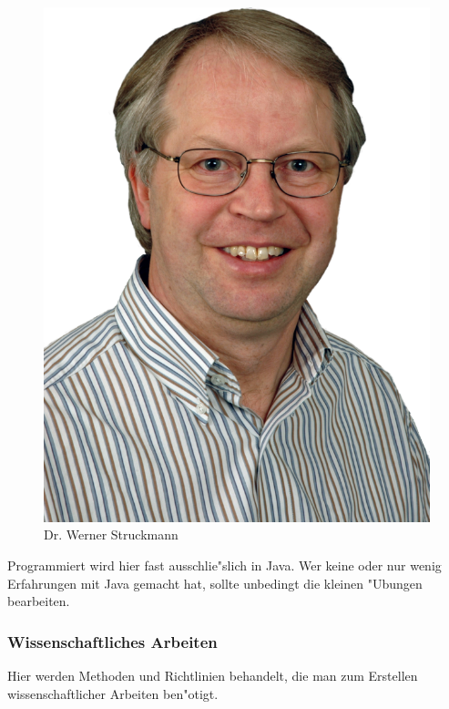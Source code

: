 \begin{figure}[h]
	\centering\includegraphics[width=0.7\linewidth]{bilder/dozenten/struck.png}\\
	{Dr. Werner Struckmann}
\end{figure}
Programmiert wird hier fast ausschlie"slich in Java. Wer keine oder nur wenig Erfahrungen mit Java gemacht hat, sollte unbedingt die kleinen "Ubungen bearbeiten.


\subsubsection{Wissenschaftliches Arbeiten}

Hier werden Methoden und Richtlinien behandelt, die man zum Erstellen
wissenschaftlicher Arbeiten ben"otigt.
